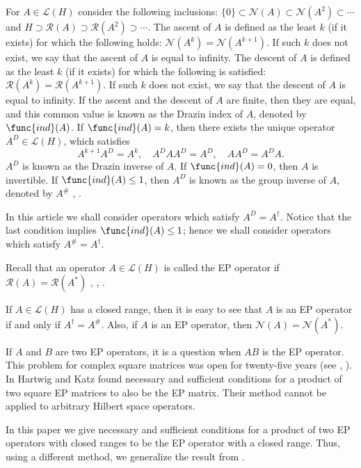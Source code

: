 \documentclass{proc-l}
\theoremstyle{plain}
\theoremstyle{remark}
\theoremstyle{definition}
\begin{document}
For $A\in \mathcal{L} (H)$ consider the following inclusions: $\{0\}\subset%
\mathcal{N} (A)\subset\mathcal{N} (A^{2})\subset\cdots $ and $H\supset 
\mathcal{R} (A)\supset \mathcal{R} (A^{2})\supset \cdots $. The ascent of $A$
is defined as the least $k$ (if it exists) for which the following holds: $%
\mathcal{N} (A^{k})=\mathcal{N} (A^{k+1})$. If such $k$ does not exist, we
say that the ascent of $A$ is equal to infinity. The descent of $A$ is
defined as the least $k$ (if it exists) for which the following is
satisfied: $\mathcal{R} (A^{k})=\mathcal{R} (A^{k+1})$. If such $k$ does not
exist, we say that the descent of $A$ is equal to infinity. If the ascent
and the descent of $A$ are finite, then they are equal, and this common
value is known as the Drazin index of $A$, denoted by $\func{ind} (A)$. If $%
\func{ind} (A)=k$, then there exists the unique operator $A^{D}\in \mathcal{L%
} (H)$, which satisfies 
\begin{equation*}
A^{k+1}A^{D}=A^{k},\quad A^{D} AA^{D}=A^{D},\quad AA^{D}=A^{D}A.
\end{equation*}
$A^{D}$ is known as the Drazin inverse of $A$. If $\func{ind} (A)=0$, then $A
$ is invertible. If $\func{ind} (A)\leq 1$, then $A^{D}$ is known as the
group inverse of $A$, denoted by $A^{\#}$ \cite{2}, \cite{4}.

In this article we shall consider operators which satisfy $A^{D}=A^{\dag }$.
Notice that the last condition implies $\func{ind} (A)\leq 1$; hence we
shall consider operators which satisfy $A^{\#}=A^{\dag }$.

Recall that an operator $A\in \mathcal{L} (H)$ is called the EP operator if $%
\mathcal{R} (A)=\mathcal{R} (A^{*})$ \cite{1}, \cite{5}, \cite{6}.

If $A\in \mathcal{L} (H)$ has a closed range, then it is easy to see that $A$
is an EP operator if and only if $A^{\dag }=A^{\#}$. Also, if $A$ is an EP
operator, then $\mathcal{N} (A)=\mathcal{N} (A^{*})$.

If $A$ and $B$ are two EP operators, it is a question when $AB$ is the EP
operator. This problem for complex square matrices was open for twenty-five
years (see \cite{1}, \cite{5}). In \cite{5} Hartwig and Katz found necessary
and sufficient conditions for a product of two square EP matrices to also be
the EP matrix. Their method cannot be applied to arbitrary Hilbert space
operators.

In this paper we give necessary and sufficient conditions for a product of
two EP operators with closed ranges to be the EP operator with a closed
range. Thus, using a different method, we generalize the result from \cite{5}%
.
\end{document}
